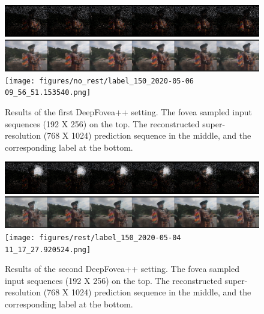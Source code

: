 \documentclass[10pt,twocolumn,letterpaper]{article}
\begin{document}
\begin{figure}[h!]
    \centering
    \includegraphics[width=\columnwidth]{figures/no_rest/input_150_2020-05-06 09_56_53.103463.png}\\\vspace{-0.1cm}
    \includegraphics[width=\columnwidth]{figures/no_rest/prediction_150_2020-05-06 09_56_48.941222.png}\\\vspace{-0.1cm}
    \texttt{[image: figures/no\_rest/label\_150\_2020-05-06 09\_56\_51.153540.png]}\\
    \caption{Results of the first DeepFovea++ setting. The fovea sampled input sequences (192 X 256) on the top. The reconstructed super-resolution (768 X 1024) prediction sequence in the middle, and the corresponding label at the bottom.}
    \label{fig:norestresults3}
\end{figure}

\begin{figure}[h!]
    \centering
    \includegraphics[width=\columnwidth]{figures/rest/input_150_2020-05-04 11_17_29.891315.png}\\\vspace{-0.1cm}
    \includegraphics[width=\columnwidth]{figures/rest/prediction_150_2020-05-04 11_17_25.749898.png}\\\vspace{-0.1cm}
    \texttt{[image: figures/rest/label\_150\_2020-05-04 11\_17\_27.920524.png]}\\
    \caption{Results of the second DeepFovea++ setting. The fovea sampled input sequences (192 X 256) on the top. The reconstructed super-resolution (768 X 1024) prediction sequence in the middle, and the corresponding label at the bottom.}
    \label{fig:restresults3}
\end{figure}
\end{document}
